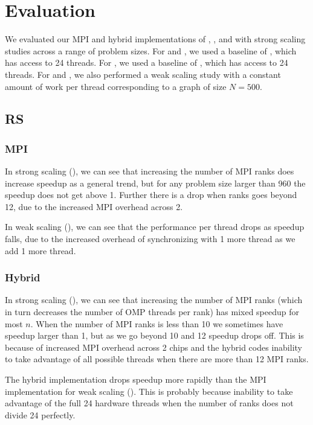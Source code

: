 \section{Evaluation}\label{sec:eval}
We evaluated our MPI and hybrid implementations of \rs{}, \block{}, and \fw{}
with strong scaling studies across a range of problem sizes. For \rs{} and
\block{}, we used a baseline of \rsomp{}, which has access to 24 threads. For
\fw{}, we used a baseline of \fwomp{}, which has access to 24 threads. For
\rs{} and \block{}, we also performed a weak scaling study with a constant
amount of work per thread corresponding to a graph of size $N=500$.

\subsection{RS}
\subsubsection{MPI}
In strong scaling (), we can see that increasing the number of MPI ranks does increase
speedup as a general trend, but for any problem size larger than 960 the speedup does not get above 1. Further
there is a drop when ranks goes beyond 12, due to the increased MPI
overhead across 2.

In weak scaling (), we can see that the performance per thread drops
as speedup falls, due to the increased overhead of
synchronizing with 1 more thread as we add 1 more thread.

\subsubsection{Hybrid}
In strong scaling (), we can see that increasing the number of MPI
ranks (which in turn decreases the number of OMP threads per rank) has mixed
speedup for most $n$. When the number of MPI ranks is less than 10 we sometimes
have speedup larger than 1, but as we go beyond 10 and 12 speedup drops off.
This is because of increased MPI overhead across 2 chips and the hybrid codes
inability to take advantage of all possible threads when there are more than 12
MPI ranks.

The hybrid implementation drops speedup more rapidly than the MPI implementation
for weak scaling (). This is probably because
inability to take advantage of the full 24 hardware threads when the number of
ranks does not divide 24 perfectly.

